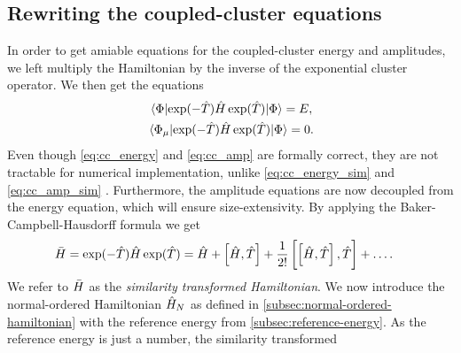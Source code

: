         \subsection{Rewriting the coupled-cluster equations}
            In order to get amiable equations for the coupled-cluster energy and
            amplitudes, we left multiply the Hamiltonian by the inverse of the
            exponential cluster operator.
            We then get the equations
            \begin{gather}
                \mel*{\slat}{
                    \exponential(-\clust)
                    \hamil
                    \exponential(\clust)
                }{\slat}
                = \energy,
                \label{eq:cc_energy_sim}
                \\
                \mel*{\slat_{\mu}}{
                    \exponential(-\clust)
                    \hamil
                    \exponential(\clust)
                }{\slat}
                = 0.
                \label{eq:cc_amp_sim}
            \end{gather}
            Even though \autoref{eq:cc_energy} and \autoref{eq:cc_amp} are
            formally correct, they are not tractable for numerical
            implementation, unlike \autoref{eq:cc_energy_sim} and
            \autoref{eq:cc_amp_sim} \cite{crawford2000introduction}.
            Furthermore, the amplitude equations are now decoupled from the
            energy equation, which will ensure size-extensivity.
            By applying the Baker-Campbell-Hausdorff formula we get
            \begin{align}
                \simhamil
                &=
                \exponential(-\clust)
                \hamil
                \exponential(\clust)
                =
                \hamil
                + \com{\hamil}{\clust}
                + \frac{1}{2!}\com{
                    \com{
                        \hamil
                    }{
                        \clust
                    }
                }{
                    \clust
                }
                + \dots.
            \end{align}
            We refer to $\bar{H}$ as the \emph{similarity transformed
            Hamiltonian}.
            We now introduce the normal-ordered Hamiltonian $\hat{H}_N$ as defined in
            \autoref{subsec:normal-ordered-hamiltonian} with the reference
            energy from \autoref{subsec:reference-energy}.
            As the reference energy is just a number, the similarity transformed
